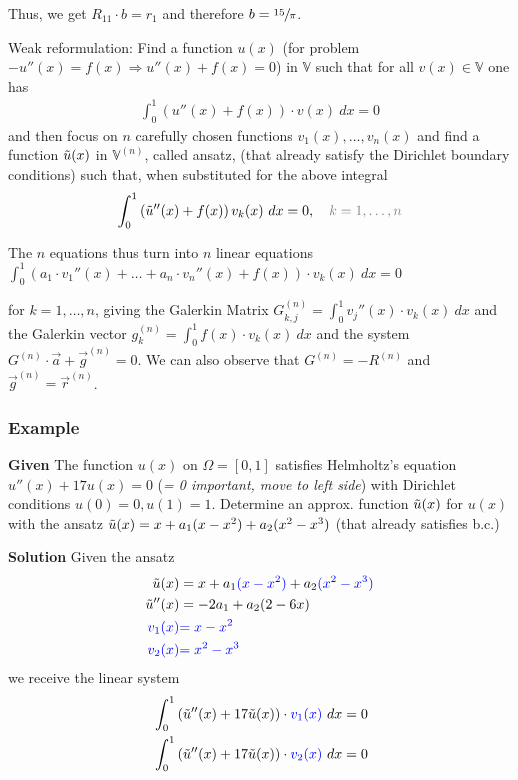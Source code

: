 Thus, we get $R_{11}\cdot b = r_1$ and therefore $b=\sfrac{15}{\pi}$.


Weak reformulation: Find a function $u(x)$ (for problem $-u''(x)=f(x)\Rightarrow u''(x)+f(x)=0$) in $\mathbb{V}$ such that for all $v(x)\in\mathbb{V}$ one has
\begin{align*}
    \int_0^1 \left(u''(x) + f(x)\right)\cdot v(x)\ dx = 0
\end{align*}
and then focus on $n$ carefully chosen functions $v_1(x),\ldots,v_n(x)$ and find a function $\tilde{u}(x)$ in $\mathbb{V}^{(n)}$,
called ansatz, (that already satisfy the Dirichlet boundary conditions) such that, when substituted for the above integral
\begin{align*}
    \int_0^1 \left(\utild''(x) + f(x)\right)v_k(x)\ dx = 0,\quad {\color{gray} k = 1,\ldots,n}
\end{align*}

The $n$ equations thus turn into $n$ linear equations
\colorbox{shadecolor}{$
    \displaystyle
    \int_0^1 \left(a_1\cdot v_1''(x)+\ldots+a_n\cdot v_n''(x) + f(x)\right)\cdot v_k(x)\ dx = 0
$}

\colorbox{shadecolor}{for $k = 1,\ldots,n$},
giving the Galerkin Matrix $G_{k,j}^{(n)} = \int_0^1 v_j''(x)\cdot v_k(x)\ dx$ and the
Galerkin vector $g_k^{(n)} = \int_0^1 f(x)\cdot v_k(x)\ dx$ and the system $G^{(n)}\cdot\vec{a} + \vec{g}^{(n)} = 0$.
We can also observe that $G^{(n)} = -R^{(n)}$ and $\vec{g}^{(n)} = \vec{r}^{(n)}$.

\subsubsection{Example}

\textbf{Given} The function $u(x)$ on $\Omega = [0,1]$ satisfies Helmholtz's equation
$u''(x) + 17u(x) = 0$ (\emph{= 0 important, move to left side}) with Dirichlet conditions
$u(0) = 0, u(1) = 1$. Determine an approx. function $\tilde{u}(x)$ for $u(x)$ with the ansatz
$\tilde{u}(x) = x + a_1(x-x^2) + a_2(x^2-x^3)$ (that already satisfies b.c.)

\textbf{Solution}
Given the ansatz
\begin{align*}
    \tilde{u}(x) & = x + a_1{\color{blue}(x-x^2)} + a_2{\color{blue}(x^2-x^3)} \\
    \tilde{u}''(x) &  = -2a_1 + a_2(2-6x) \\
    {\color{blue} v_1(x)} & {\color{blue} = x-x^2} \\
    {\color{blue}v_2(x)} & {\color{blue}= x^2 - x^3}
\end{align*}
we receive the linear system
\begin{align*}
    & \int_0^1 \left(\tilde{u}''(x) + 17\tilde{u}(x)\right)\cdot {\color{blue}v_1(x)}\ dx = 0 \\
    & \int_0^1 \left(\tilde{u}''(x) + 17\tilde{u}(x)\right)\cdot {\color{blue}v_2(x)}\ dx = 0
\end{align*}

